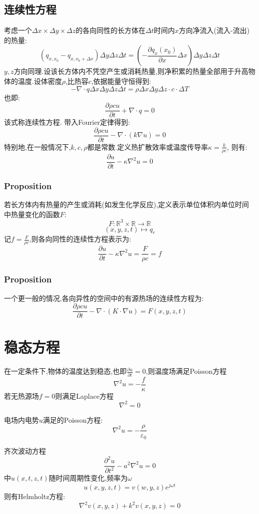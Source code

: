 \documentclass[12pt, a4paper, oneside]{ctexbook}
\newcommand{\pian }{\partial}%
\newcommand{\R }{\mathbb{R}}%
\begin{document}
\subsection{连续性方程}
  考虑一个$\Delta x\times \Delta y\times \Delta z$的各向同性的长方体在$\Delta t$时间内$x$方向净流入(流入-流出)的热量:
  $$
    (q_{x,x_0}-q_{x,x_0+\Delta x})\Delta y\Delta z \Delta t=(-\frac{\pian q_x(x_0)}{\pian x}\Delta x )\Delta y \Delta z \Delta t
  $$
  $y,z$方向同理.设该长方体内不凭空产生或消耗热量,则净积累的热量全部用于升高物体的温度.设体密度$\rho$,比热容$c$,依据能量守恒得到:
  $$
    -\nabla \cdot q \Delta x\Delta y \Delta z \Delta t=\rho \Delta x\Delta y \Delta z\cdot c\cdot \Delta T
  $$
  也即:
  $$
    \frac{\pian \rho c u}{\pian t}+\nabla \cdot q=0
  $$
  该式称连续性方程.
  带入Fourier定律得到:
  $$
    \frac{\pian \rho c u}{\pian t}-\nabla \cdot (k\nabla u)=0
  $$
  特别地,在一般情况下,$k,c,\rho$都是常数.定义热扩散效率或温度传导率$\kappa =\frac{k}{\rho c}$,
  则有:
  $$
    \frac{\pian u}{\pian t}-\kappa\nabla^2 u=0
  $$
  \subsubsection{Proposition}
  若长方体内有热量的产生或消耗(如发生化学反应),定义表示单位体积内单位时间中热量变化的函数$F$:
  $$
    F:\R^3\times \R\rightarrow \R
  $$
  $$
    (x,y,z,t)\mapsto q_r
  $$
  记$f=\frac{F}{\rho c}$,则各向同性的连续性方程表示为:
  $$
    \frac{\pian u}{\pian t}-\kappa\nabla^2 u=\frac{F}{\rho c}=f
  $$
  \subsubsection{Proposition}
  一个更一般的情况,各向异性的空间中的有源热场的连续性方程为:
  $$
    \frac{\pian \rho c u}{\pian t}-\nabla \cdot (K\cdot \nabla u)=F(x,y,z,t)
  $$
  \section{稳态方程}
  在一定条件下,物体的温度达到稳态,也即$\frac{\pian u}{\pian t}=0$,则温度场满足Poisson方程
  $$
    \nabla^2u=-\frac{f}{\kappa}
  $$
  若无热源场$f=0$则满足Laplace方程
  $$
    \nabla^2=0
  $$
  
  电场内电势$u$满足的Poisson方程:
  $$
    \nabla^2u=-\frac{\rho }{\varepsilon_0}
  $$

  齐次波动方程
  $$
      \frac{\pian^2 u}{\pian t^2}-a^2\nabla^2 u=0
  $$
  中$u(x,t,z,t)$随时间周期性变化,频率为$\omega$
  $$
    u(x,y,z,t)=v(w,y,z)e^{j\omega t}
  $$
  则有Helmholtz方程:
  $$
    \nabla^2v(x,y,z)+k^2v(x,y,z)=0
  $$
\end{document}
